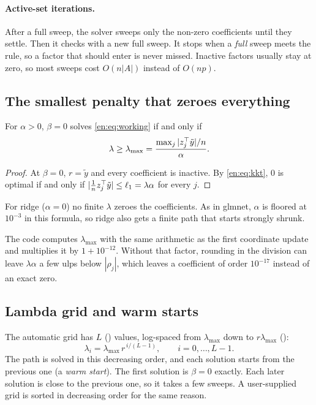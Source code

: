 \paragraph{Active-set iterations.} After a full sweep, the solver sweeps only the non-zero
coefficients until they settle. Then it checks with a new full sweep. It stops when a
\emph{full} sweep meets the rule, so a factor that should enter is never missed. Inactive
factors usually stay at zero, so most sweeps cost $O(n|A|)$ instead of $O(np)$.

\subsection{The smallest penalty that zeroes everything}

\begin{proposition}[$\lambda_{\max}$]\label{en:prop:lmax}
For $\alpha>0$, $\beta=0$ solves \eqref{en:eq:working} if and only if
\[
  \lambda\ge\lambda_{\max}=\frac{\max_j|z_j^\top\tilde y|/n}{\alpha}.
\]
\end{proposition}
\begin{proof}
At $\beta=0$, $r=\tilde y$ and every coefficient is inactive. By \eqref{en:eq:kkt}, $0$ is optimal
if and only if $|\frac1nz_j^\top\tilde y|\le\ell_1=\lambda\alpha$ for every $j$.
\end{proof}
For ridge ($\alpha=0$) no finite $\lambda$ zeroes the coefficients. As in glmnet, $\alpha$ is
floored at $10^{-3}$ in this formula, so ridge also gets a finite path that starts strongly
shrunk.

The code computes $\lambda_{\max}$ with the same arithmetic as the first coordinate update
and multiplies it by $1+10^{-12}$. Without that factor, rounding in the division can leave
$\lambda\alpha$ a few ulps below $|\rho_j|$, which leaves a coefficient of order $10^{-17}$
instead of an exact zero.

\subsection{Lambda grid and warm starts}
The automatic grid has $L$ () values, log-spaced from $\lambda_{\max}$ down to
$r\lambda_{\max}$ ():
\[
  \lambda_i=\lambda_{\max}\,r^{\,i/(L-1)},\qquad i=0,\dots,L-1 .
\]
The path is solved in this decreasing order, and each solution starts from the previous one
(a \emph{warm start}). The first solution is $\beta=0$ exactly. Each later solution is close
to the previous one, so it takes a few sweeps. A user-supplied grid is sorted in decreasing
order for the same reason.

